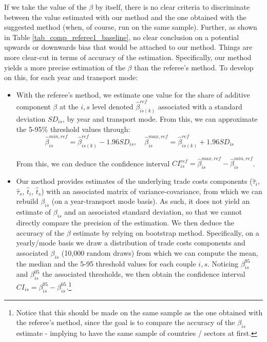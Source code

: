 \documentclass[a4paper,11pt]{article}
\begin{document}
\begin{itemize}
\begin{enumerate}
\begin{table}[htbp]
\begin{itemize}
If we take the value of the $\beta$ by itself, there is no clear criteria to discriminate between the value estimated with our method and the one obtained with the suggested method (when, of course, run on the same sample). Further, as shown in Table \ref{tab_comp_referee1_baseline}, no clear conclusion on a potential upwards or downwards bias that would be attached to our method. Things are more clear-cut in terms of accuracy of the estimation. Specifically, our method yields a more precise estimation of the $\beta$ than the referee's method. To develop on this, for each year and transport mode:
    \begin{itemize}
    \item With the referee's method, we estimate one value for the share of additive component $\beta$ at the $i,s$ level denoted $\hat{\beta}^{ref}_{is(k)}$ associated with a standard deviation $SD_{is}$, by year and transport mode. From this, we can approximate the 5-95\% threshold values through:
        $$\hat{\beta}_{is}^{min,ref} = \hat{\beta}^{ref}_{is(k)} - 1.96 SD_{is},\quad \hat{\beta}_{is}^{max,ref} = \hat{\beta}^{ref}_{is(k)} + 1.96 SD_{is}$$

        From this, we can deduce the confidence interval $CI^{ref}_{is} = \hat{\beta}_{is}^{max,ref} - \hat{\beta}_{is}^{min,ref}$.

        \item  Our method provides estimates of the underlying trade costs components ($\widehat{\tau}_i$, $\widehat{\tau}_s$, $\widehat{t}_i$, $\widehat{t}_s$) with an associated matrix of variance-covariance, from which we can rebuild $\beta_{is}$ (on a year-transport mode basis). As such, it does not yield an estimate of $\beta_{is}$ and an associated standard deviation, so that we cannot directly compare the precision of the estimation. We then deduce the accuracy of the $\beta$ estimate by relying on bootstrap method. Specifically, on a yearly/mode basis we draw a distribution of trade costs components and associated $\beta_{is}$ (10,000 random draws) from which we can compute the mean, the median and the 5-95 threshold values for each couple $i,s$. Noticing $\beta_{is}^{95}$ and $\beta_{is}^{05}$ the associated thresholds, we then obtain the confidence interval $CI_{is}= \beta_{is}^{95}- \beta_{is}^{05}$.\footnote{Notice that this should be made on the same sample as the one obtained with the referee's method, since the goal is to compare the accuracy of the $\beta_{is}$ estimate - implying to have the same sample of countries / sectors at first. }




\end{itemize}
\end{itemize}
\end{table}
\end{enumerate}
\end{itemize}
\end{document}
